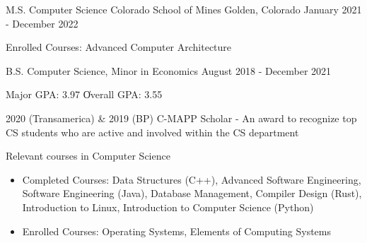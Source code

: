 \vspace{-2.0mm}


\begin{cventries}


\cventry
    {M.S. Computer Science }
    {Colorado School of Mines} %
    {Golden, Colorado} %
    {January 2021 - December 2022} %
    {
      \begin{cvitems}
        \item {Enrolled Courses: Advanced Computer Architecture}
      \end{cvitems}
    }
    {}
    \vspace{-1.0mm}
  \cventry
    {B.S. Computer Science, Minor in Economics}
    {} %
    {} %
    {August 2018 - December 2021} %
    {
      \begin{cvitems} %
        \item {Major GPA: 3.97 \| Overall GPA: 3.55}
    \item {2020 (Transamerica) \& 2019 (BP) C-MAPP Scholar - An award to recognize top CS students who are active and involved within the CS department}
        \ifcv
        \item{Relevant courses in Computer Science}
        \begin{itemize}
          \item {Completed Courses: Data Structures (C++), Advanced Software Engineering, Software Engineering (Java), Database Management, Compiler Design (Rust), Introduction to Linux, Introduction to Computer Science (Python)}
          \item {Enrolled Courses: Operating Systems, Elements of Computing Systems}

\end{itemize}
\end{cvitems}}
\end{cventries}
